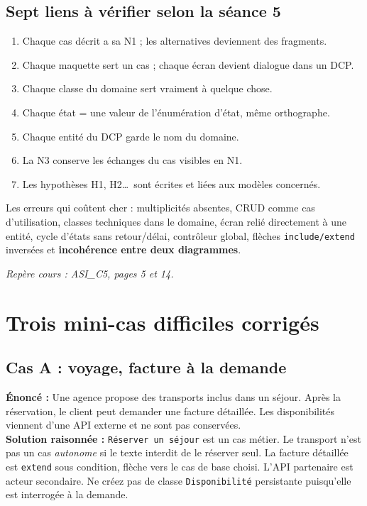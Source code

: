 \documentclass[10pt,a4paper]{article}
\newcommand{\source}[1]{\par{\footnotesize\color{bodygray}\textit{Repère cours : #1}}}
\begin{document}
\subsection{Sept liens à vérifier selon la séance 5}
\begin{enumerate}
\item Chaque cas décrit a sa N1 ; les alternatives deviennent des fragments.
\item Chaque maquette sert un cas ; chaque écran devient dialogue dans un DCP.
\item Chaque classe du domaine sert vraiment à quelque chose.
\item Chaque état = une valeur de l'énumération d'état, même orthographe.
\item Chaque entité du DCP garde le nom du domaine.
\item La N3 conserve les échanges du cas visibles en N1.
\item Les hypothèses H1, H2\ldots\ sont écrites et liées aux modèles concernés.
\end{enumerate}
\begin{warningbox}
Les erreurs qui coûtent cher : multiplicités absentes, CRUD comme cas d'utilisation, classes techniques dans le domaine, écran relié directement à une entité, cycle d'états sans retour/délai, contrôleur global, flèches \texttt{include/extend} inversées et \textbf{incohérence entre deux diagrammes}.
\end{warningbox}
\source{ASI\_C5, pages 5 et 14.}

\section{Trois mini-cas difficiles corrigés}
\subsection{Cas A : voyage, facture à la demande}
\textbf{Énoncé :} Une agence propose des transports inclus dans un séjour. Après la réservation, le client peut demander une facture détaillée. Les disponibilités viennent d'une API externe et ne sont pas conservées.\\
\textbf{Solution raisonnée :} \texttt{Réserver un séjour} est un cas métier. Le transport n'est pas un cas \emph{autonome} si le texte interdit de le réserver seul. La facture détaillée est \texttt{extend} sous condition, flèche vers le cas de base choisi. L'API partenaire est acteur secondaire. Ne créez pas de classe \texttt{Disponibilité} persistante puisqu'elle est interrogée à la demande.
\end{document}

